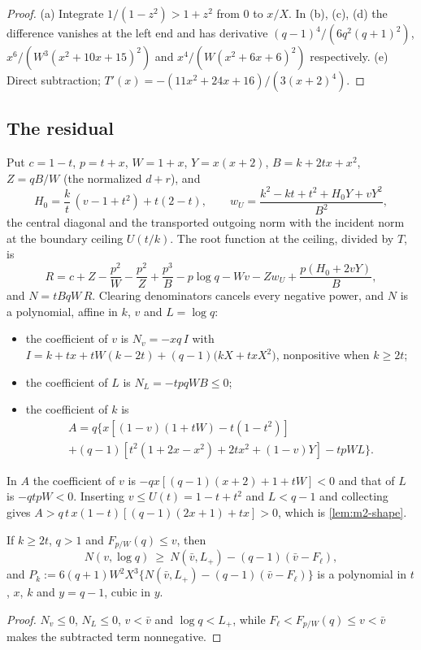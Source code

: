\begin{proof}
(a) Integrate $1/(1-z^2)>1+z^2$ from $0$ to $x/X$. In (b), (c), (d) the difference vanishes at the
left end and has derivative $(q-1)^4/(6q^2(q+1)^2)$, $x^6/(W^3(x^2+10x+15)^2)$ and
$x^4/(W(x^2+6x+6)^2)$ respectively. (e) Direct subtraction; $T'(x)=-(11x^2+24x+16)/(3(x+2)^4)$.
\end{proof}

\subsection{The residual}\label{app:m2-residual}

Put $c=1-t$, $p=t+x$, $W=1+x$, $Y=x(x+2)$, $B=k+2tx+x^2$, $Z=qB/W$ (the normalized $d+r$), and
\[
H_0=\frac kt\,(v-1+t^2)+t(2-t),\qquad w_U=\frac{k^2-kt+t^2+H_0Y+vY^2}{B^2},
\]
the central diagonal and the transported outgoing norm with the incident norm at the boundary
ceiling $U(t/k)$. The root function at the ceiling, divided by $T$, is
\[
R=c+Z-\frac{p^2}{W}-\frac{p^2}{Z}+\frac{p^3}{B}-p\log q-Wv-Zw_U+\frac{p(H_0+2vY)}{B},
\]
and $N=tBqW\,R$. Clearing denominators cancels every negative power, and $N$ is a polynomial,
affine in $k$, $v$ and $L=\log q$:
\begin{itemize}
\item the coefficient of $v$ is $N_v=-xq\,I$ with
$I=k+tx+tW(k-2t)+(q-1)\bigl(kX+txX^2\bigr)$, nonpositive when $k\ge2t$;
\item the coefficient of $L$ is $N_L=-tpqWB\le0$;
\item the coefficient of $k$ is
\begin{multline*}
A=q\bigl\{x[(1-v)(1+tW)-t(1-t^2)]\\
+(q-1)[t^2(1+2x-x^2)+2tx^2+(1-v)Y]-tpW L\bigr\}.
\end{multline*}
\end{itemize}
In $A$ the coefficient of $v$ is $-qx[(q-1)(x+2)+1+tW]<0$ and that of $L$ is $-qtpW<0$. Inserting
$v\le U(t)=1-t+t^2$ and $L<q-1$ and collecting gives
$A>q\,t\,x(1-t)[(q-1)(2x+1)+tx]>0$, which is \cref{lem:m2-shape}.

\begin{lemma}\label{lem:m2-relax}
If $k\ge2t$, $q>1$ and $F_{p/W}(q)\le v$, then
\[
N(v,\log q)\ \ge\ N(\bar v,L_+)-(q-1)(\bar v-F_\ell),
\]
and $P_k:=6(q+1)W^2X^3\{N(\bar v,L_+)-(q-1)(\bar v-F_\ell)\}$ is a polynomial in $t$, $x$, $k$ and
$y=q-1$, cubic in $y$.
\end{lemma}

\begin{proof}
$N_v\le0$, $N_L\le0$, $v<\bar v$ and $\log q<L_+$, while $F_\ell<F_{p/W}(q)\le v<\bar v$ makes the
subtracted term nonnegative.
\end{proof}

